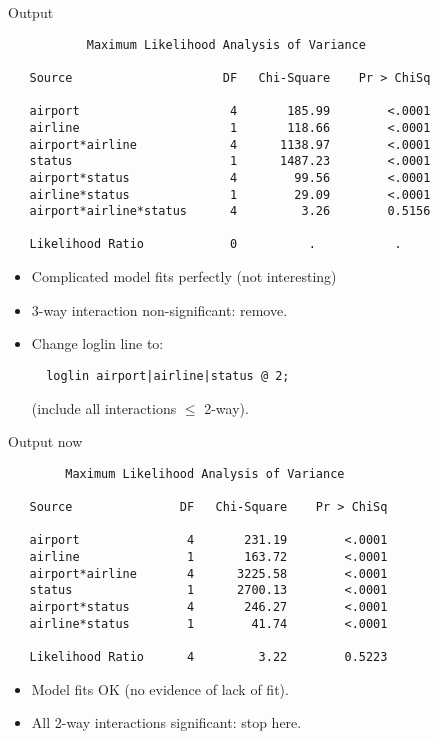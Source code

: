 \documentclass[pdf]{prosper}
\begin{document}
\begin{slide}{Output}

{\scriptsize
\begin{verbatim}
           Maximum Likelihood Analysis of Variance

   Source                     DF   Chi-Square    Pr > ChiSq

   airport                     4       185.99        <.0001
   airline                     1       118.66        <.0001
   airport*airline             4      1138.97        <.0001
   status                      1      1487.23        <.0001
   airport*status              4        99.56        <.0001
   airline*status              1        29.09        <.0001
   airport*airline*status      4         3.26        0.5156

   Likelihood Ratio            0          .           .

\end{verbatim}
}

\begin{itemize}
\item Complicated model fits perfectly (not interesting)
\item 3-way interaction non-significant: remove.
\item Change loglin line to:

\begin{verbatim}
  loglin airport|airline|status @ 2;

\end{verbatim}
(include all interactions $\le$ 2-way).
\end{itemize}
  
\end{slide}

\begin{slide}{Output now}

{\scriptsize
\begin{verbatim}
        Maximum Likelihood Analysis of Variance

   Source               DF   Chi-Square    Pr > ChiSq

   airport               4       231.19        <.0001
   airline               1       163.72        <.0001
   airport*airline       4      3225.58        <.0001
   status                1      2700.13        <.0001
   airport*status        4       246.27        <.0001
   airline*status        1        41.74        <.0001

   Likelihood Ratio      4         3.22        0.5223

\end{verbatim}
}

\begin{itemize}
\item Model fits OK (no evidence of lack of fit).
\item All 2-way interactions significant: stop here.
\end{itemize}
  
\end{slide}
\end{document}
